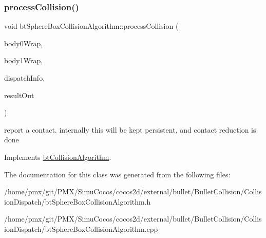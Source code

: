 \subsubsection{\texorpdfstring{process\+Collision()}{processCollision()}}
{\footnotesize\ttfamily void bt\+Sphere\+Box\+Collision\+Algorithm\+::process\+Collision (\begin{DoxyParamCaption}\item[{const \hyperlink{structbtCollisionObjectWrapper}{bt\+Collision\+Object\+Wrapper} $\ast$}]{body0\+Wrap,  }\item[{const \hyperlink{structbtCollisionObjectWrapper}{bt\+Collision\+Object\+Wrapper} $\ast$}]{body1\+Wrap,  }\item[{const \hyperlink{structbtDispatcherInfo}{bt\+Dispatcher\+Info} \&}]{dispatch\+Info,  }\item[{\hyperlink{classbtManifoldResult}{bt\+Manifold\+Result} $\ast$}]{result\+Out }\end{DoxyParamCaption})\hspace{0.3cm}{\ttfamily [virtual]}}

report a contact. internally this will be kept persistent, and contact reduction is done 

Implements \hyperlink{classbtCollisionAlgorithm}{bt\+Collision\+Algorithm}.



The documentation for this class was generated from the following files\+:\begin{DoxyCompactItemize}
\item 
/home/pmx/git/\+P\+M\+X/\+Simu\+Cocos/cocos2d/external/bullet/\+Bullet\+Collision/\+Collision\+Dispatch/bt\+Sphere\+Box\+Collision\+Algorithm.\+h\item 
/home/pmx/git/\+P\+M\+X/\+Simu\+Cocos/cocos2d/external/bullet/\+Bullet\+Collision/\+Collision\+Dispatch/bt\+Sphere\+Box\+Collision\+Algorithm.\+cpp\end{DoxyCompactItemize}
